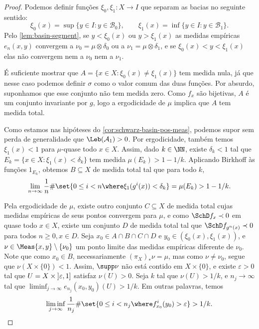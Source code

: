 \documentclass[../fapesp0]{subfiles}
\begin{document}
\begin{proof}
  Podemos definir funções \(\xi_0, \xi_1 \colon X \to I\) que separam as bacias no seguinte sentido:
  \begin{equation*}
    \xi_0(x) = \sup \{ y \in I : y \in \mathcal{B}_0 \}, \qquad \xi_1(x) = \inf \{ y \in I : y \in \mathcal{B}_1 \}.
  \end{equation*}
  Pelo \cref{lem:basin-segment}, se \(y < \xi_0(x)\) ou \(y > \xi_1(x)\) as medidas empíricas \(e_n(x,y)\) convergem a \(\nu_0 = \mu \otimes \delta_0\) ou a \(\nu_1 = \mu \otimes \delta_1\), e se \(\xi_0(x) < y < \xi_1(x)\) elas não convergem nem a \(\nu_0\) nem a \(\nu_1\).
  
  É suficiente mostrar que \(A = \{ x \in X : \xi_0(x) \neq \xi_1(x) \}\) tem medida nula, já que nesse caso podemos definir \(\sigma\) como o valor comum das duas funções. Por absurdo, suponhamos que esse conjunto não tem medida zero. Como \(f_x\) são bijetivas, \(A\) é um conjunto invariante por \(g\), logo a ergodicidade de \(\mu\) implica que \(A\) tem medida total.

  Como estamos nas hipóteses do \cref{cor:schwarz-basin-pos-meas}, podemos supor sem perda de generalidade que \(\Leb(\mathcal{A}_1) > 0\). Por ergodicidade, também temos \(\xi_1(x) < 1\) para \(\mu\)-quase todo \(x \in X\). Assim, dado \(k \in \NN\), existe \(\delta_k < 1\) tal que \(E_k = \{ x \in X : \xi_1(x) < \delta_k \}\) tem medida \(\mu(E_k) > 1 - 1/k\). Aplicando Birkhoff às funções \(1_{E_k}\), obtemos \(B \subseteq X\) de medida total tal que para todo \(k\),
  \begin{equation}\label{eq:time-small}
    \lim_{n \to \infty} \frac{1}{n} \# \set{ 0 \leq i < n \where \xi_1(g^i(x)) < \delta_k} = \mu(E_{k}) > 1 - 1/k.
  \end{equation}
  
  Pela ergodicidade de \(\mu\), existe outro conjunto \(C \subseteq X\) de medida total cujas medidas empíricas de seus pontos convergem para \(\mu\), e como \(\SchD f_x \prec 0\) em quase todo \(x \in X\), existe um conjunto \(D\) de medida total tal que \(\SchD f_{g^n(x)} \prec 0\) para todos \(n \geq 0, x \in D\). Seja \(x_0 \in A \cap B \cap C \cap D\) e \(y_0 \in (\xi_0(x),\xi_1(x))\),  e \(\nu \in \Meas{x,y} \setminus \{ \nu_0 \}\) um ponto limite das medidas empíricas diferente de \(\nu_0\). Note que como \(x_0 \in B\), necessariamente \((\pi_X)_* \nu = \mu\), mas como \(\nu \neq \nu_0\), segue que \(\nu(X \times \{ 0 \}) < 1\). Assim, \(\supp \nu\) não está contido em \(X \times \{ 0 \}\), e existe \(\varepsilon > 0\) tal que \(U = X \times \interval[open left]{\varepsilon}{1}\) satisfaz \(\nu(U) > 0\). Seja \(k\) tal que \(\nu(U) > 1/k\), e \(n_j \to \infty\) tal que \(\liminf_{j \to \infty} e_{n_j}(x_0,y_0)(U) > 1/k\).
  Em outras palavras, temos
  \begin{equation}\label{eq:time-big}
    \liminf_{j \to \infty} \frac{1}{n_j} \# \set{ 0 \leq i < n_j \where f_{x_0}^i(y_0) > \varepsilon} > 1/k.
  \end{equation}


\end{proof}
\end{document}
